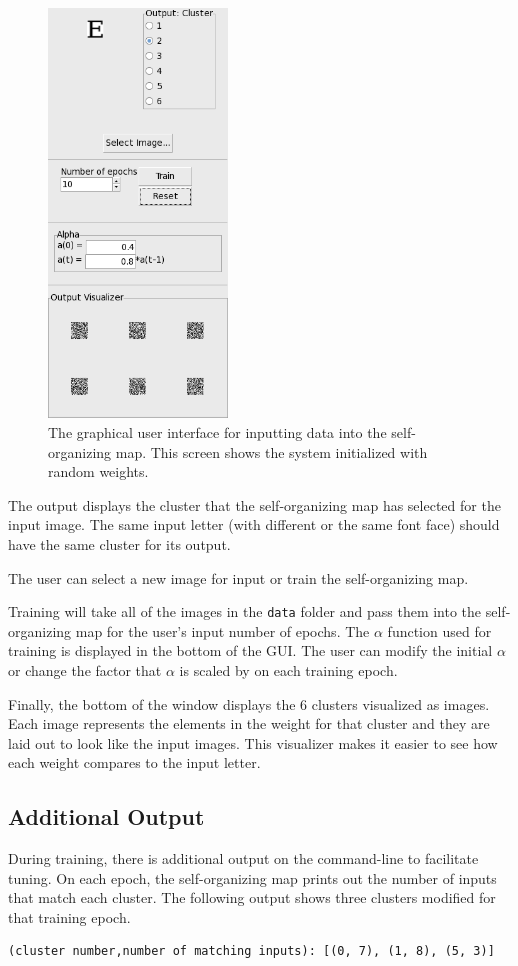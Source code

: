 \documentclass[12pt,letterpaper,oneside]{report}
\newcommand \code[1]{\texttt{#1}}
\begin{document}
\begin{figure}[ht]
  \centering
  \includegraphics[width=180px]{diagrams/gui-plain.png} 
  \caption{The graphical user interface for inputting data into the self-organizing map. This screen shows the system initialized with random weights.}
  \label{fig:gui-plain}
\end{figure}

The output displays the cluster that the self-organizing map has selected for the input image. The same input letter (with different or the same font face) should have the same cluster for its output.

The user can select a new image for input or train the self-organizing map.

Training will take all of the images in the \code{data} folder and pass them into the self-organizing map for the user's input number of epochs. The $\alpha$ function used for training is displayed in the bottom of the GUI. The user can modify the initial $\alpha$ or change the factor that $\alpha$ is scaled by on each training epoch. 

Finally, the bottom of the window displays the 6 clusters visualized as images. Each image represents the elements in the weight for that cluster and they are laid out to look like the input images. This visualizer makes it easier to see how each weight compares to the input letter.

\subsection{Additional Output}
During training, there is additional output on the command-line to facilitate tuning. On each epoch, the self-organizing map prints out the number of inputs that match each cluster. The following output shows three clusters modified for that training epoch.
\begin{verbatim}
(cluster number,number of matching inputs): [(0, 7), (1, 8), (5, 3)]
\end{verbatim}
\end{document}
